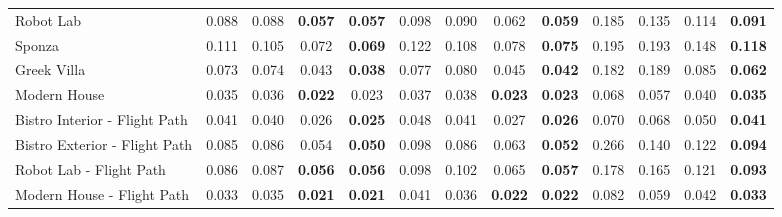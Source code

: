 \begin{table*}[t]
\begin{tabular}{l cccc|cccc|cccc}
Robot Lab                     & 0.088          & 0.088                  & \textbf{0.057}          & \textbf{0.057}          & 0.098          & 0.090                  & 0.062                   & \textbf{0.059}          & 0.185          & 0.135                  & 0.114                   & \textbf{0.091}          \\
Sponza                        & 0.111          & 0.105                  & 0.072                   & \textbf{0.069}          & 0.122          & 0.108                  & 0.078                   & \textbf{0.075}          & 0.195          & 0.193                  & 0.148                   & \textbf{0.118}          \\
Greek Villa                   & 0.073          & 0.074                  & 0.043                   & \textbf{0.038}          & 0.077          & 0.080                  & 0.045                   & \textbf{0.042}          & 0.182          & 0.189                  & 0.085                   & \textbf{0.062}          \\
Modern House                  & 0.035          & 0.036                  & \textbf{0.022}          & 0.023                   & 0.037          & 0.038                  & \textbf{0.023}          & \textbf{0.023}          & 0.068          & 0.057                  & 0.040                   & \textbf{0.035}          \\
Bistro Interior - Flight Path & 0.041          & 0.040                  & 0.026                   & \textbf{0.025}          & 0.048          & 0.041                  & 0.027                   & \textbf{0.026}          & 0.070          & 0.068                  & 0.050                   & \textbf{0.041}          \\
Bistro Exterior - Flight Path & 0.085          & 0.086                  & 0.054                   & \textbf{0.050}          & 0.098          & 0.086                  & 0.063                   & \textbf{0.052}          & 0.266          & 0.140                  & 0.122                   & \textbf{0.094}          \\
Robot Lab - Flight Path       & 0.086          & 0.087                  & \textbf{0.056}          & \textbf{0.056}          & 0.098          & 0.102                  & 0.065                   & \textbf{0.057}          & 0.178          & 0.165                  & 0.121                   & \textbf{0.093}          \\
Modern House - Flight Path    & 0.033          & 0.035                  & \textbf{0.021}          & \textbf{0.021}          & 0.041          & 0.036                  & \textbf{0.022}          & \textbf{0.022}          & 0.082          & 0.059                  & 0.042                   & \textbf{0.033}          \\

\end{tabular}
\end{table*}
